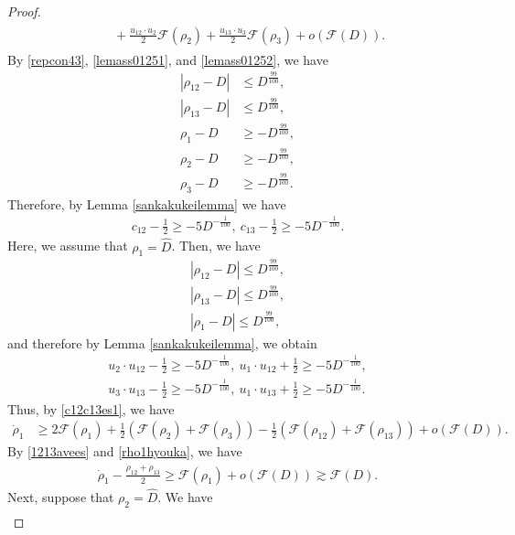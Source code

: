 \documentclass[reqno]{amsart}
\theoremstyle{plain}
\theoremstyle{definition}
\numberwithin{equation}{section}
\newcommand{\1}{\mathbbm{1}}
\begin{document}
\begin{proof}
\begin{align}
\begin{aligned}
&\quad+\frac{u_{12}\cdot u_2}{2}\mathcal{F}(\rho_2)+\frac{u_{13}\cdot u_3}{2}\mathcal{F}(\rho_3)+o\left(\mathcal{F}(D)\right).
\end{aligned}
\end{align}
By \eqref{repcon43}, \eqref{lemass01251}, and \eqref{lemass01252}, we have
\begin{align*}
|\rho_{12}-D|&\leq D^{\frac{99}{100}},
\\
|\rho_{13}-D|&\leq D^{\frac{99}{100}},
\\
\rho_1-D&\geq -D^{\frac{99}{100}},
\\
\rho_2-D&\geq -D^{\frac{99}{100}},
\\
\rho_3-D&\geq -D^{\frac{99}{100}}.
\end{align*}
Therefore, by Lemma \ref{sankakukeilemma} we have
\begin{align}\label{c12c13es1}
c_{12}-\frac{1}{2}\geq -5D^{-\frac{1}{100}},\ c_{13}-\frac{1}{2}\geq -5D^{-\frac{1}{100}}.
\end{align}
Here, we assume that  $\rho_1=\hat{D}$. Then, we have
\begin{align*}
|\rho_{12}-D|\leq D^{\frac{99}{100}},
\\
|\rho_{13}-D|\leq D^{\frac{99}{100}},
\\
|\rho_1-D|\leq D^{\frac{99}{100}},
\end{align*}
and therefore by Lemma \ref{sankakukeilemma}, we obtain
\begin{align*}
u_2\cdot u_{12}-\frac{1}{2}\geq -5D^{-\frac{1}{100}},\ u_1\cdot u_{12}+\frac{1}{2}\geq -5D^{-\frac{1}{100}},
\\
u_3\cdot u_{13}-\frac{1}{2}\geq -5D^{-\frac{1}{100}},\ u_1\cdot u_{13}+\frac{1}{2}\geq -5D^{-\frac{1}{100}}.
\end{align*}
Thus, by \eqref{c12c13es1}, we have
\begin{align}\label{rho1hyouka}
\dot{\rho}_1&\geq 2\mathcal{F}(\rho_1)+\frac{1}{2}\left(\mathcal{F}(\rho_2)+\mathcal{F}(\rho_3)\right)-\frac{1}{2}\left(\mathcal{F}(\rho_{12})+\mathcal{F}(\rho_{13})\right)+o\left(\mathcal{F}(D)\right).
\end{align}
By \eqref{1213avees} and \eqref{rho1hyouka}, we have
\begin{align}\label{est01251}
\dot{\rho}_1-\frac{\dot{\rho}_{12}+\dot{\rho}_{13}}{2}\geq \mathcal{F}(\rho_1)+o\left(\mathcal{F}(D)\right)\gtrsim \mathcal{F}(D).
\end{align}
Next, suppose that $\rho_2=\hat{D}$. We have
\begin{align}\label{naisekihyouka0131}

\end{align}
\end{proof}
\end{document}
